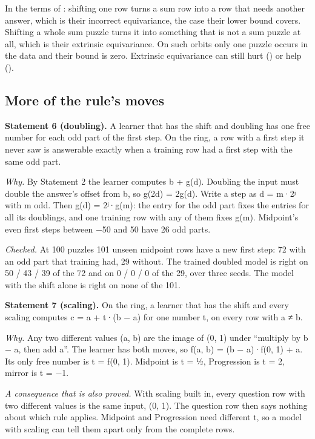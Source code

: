 In the terms of \citet{wang2023general}: shifting one row turns a sum row into a row that needs another answer, which is their incorrect equivariance, the case their lower bound covers. Shifting a whole sum puzzle turns it into something that is not a sum puzzle at all, which is their extrinsic equivariance. On such orbits only one puzzle occurs in the data and their bound is zero. Extrinsic equivariance can still hurt (\citealp[Section 5]{wang2023general}) or help (\citealp{wang2023surprising}).

\subsection{More of the rule's moves}\label{sec:3.6.4}

\textbf{Statement 6 (doubling).} A learner that has the shift and doubling has one free number for each odd part of the first step. On the ring, a row with a first step it never saw is answerable exactly when a training row had a first step with the same odd part.

\emph{Why.} By Statement 2 the learner computes b + g(d). Doubling the input must double the answer's offset from b, so g(2d) = 2g(d). Write a step as d = m·2ʲ with m odd. Then g(d) = 2ʲ·g(m): the entry for the odd part fixes the entries for all its doublings, and one training row with any of them fixes g(m). Midpoint's even first steps between −50 and 50 have 26 odd parts.

\emph{Checked.} At 100 puzzles 101 unseen midpoint rows have a new first step: 72 with an odd part that training had, 29 without. The trained doubled model is right on 50 / 43 / 39 of the 72 and on 0 / 0 / 0 of the 29, over three seeds. The model with the shift alone is right on none of the 101.

\textbf{Statement 7 (scaling).} On the ring, a learner that has the shift and every scaling computes c = a + t·(b − a) for one number t, on every row with a ≠ b.

\emph{Why.} Any two different values (a, b) are the image of (0, 1) under ``multiply by b − a, then add a''. The learner has both moves, so f(a, b) = (b − a)·f(0, 1) + a. Its only free number is t = f(0, 1). Midpoint is t = ½, Progression is t = 2, mirror is t = −1.

\emph{A consequence that is also proved.} With scaling built in, every question row with two different values is the same input, (0, 1). The question row then says nothing about which rule applies. Midpoint and Progression need different t, so a model with scaling can tell them apart only from the complete rows.

